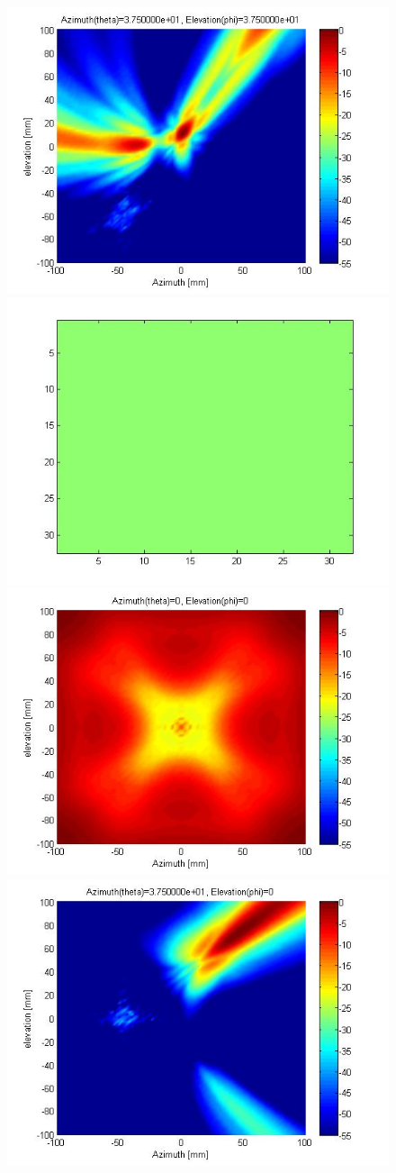 \documentclass[a4paper]{article}
\begin{document}
\begin{figure}[!htbp]
\subcaption{}\label{8}
\includegraphics[width=.7\textwidth]{5.jpg}
\subcaption{}\label{10}
\endminipage\hfill
{}%
\centering
\includegraphics[width=.7\textwidth]{6.jpg}\\
\subcaption{}\label{3}
\includegraphics[width=.7\textwidth]{7.jpg}\\
\subcaption{}\label{5}
\includegraphics[width=.7\textwidth]{8.jpg}\\

\end{figure}
\end{document}

